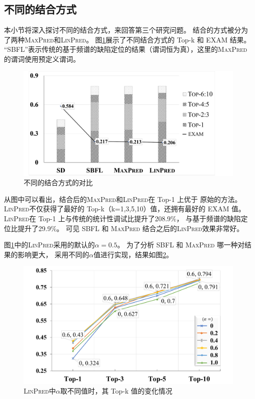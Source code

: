 \subsection{不同的结合方式}

本小节将深入探讨不同的结合方式，来回答第三个研究问题。
结合的方式被分为了两种\textsc{MaxPred}和\textsc{LinPred}。
图\ref{fig:diff-comb-compare}展示了不同结合方式的 Top-k 和 EXAM 结果。
“SBFL”表示传统的基于频谱的缺陷定位的结果（谓词恒为真），这里的\textsc{MaxPred}的谓词使用预定义谓词。

\begin{figure}[htbp] 
\centering 
\includegraphics[width=12cm]{figure/diff-comb-compare} 
\caption{不同的结合方式的对比} 
\label{fig:diff-comb-compare}
\end{figure}

从图中可以看出，结合后的\textsc{MaxPred}和\textsc{LinPred}在 Top-1 上优于
原始的方法。
\textsc{LinPred}不仅获得了最好的 Top-k（k=1,3,5,10）值，还拥有最好的 EXAM 值。
\textsc{LinPred}在 Top-1 上与传统的统计性调试比提升了208.9\%，
与基于频谱的缺陷定位比提升了29.9\%。
可见 SBFL 和 \textsc{MaxPred} 结合之后的\textsc{LinPred}效果非常好。

图\ref{fig:diff-comb-compare}中的\textsc{LinPred}采用的默认的$\alpha = 0.5$。
为了分析 SBFL 和 \textsc{MaxPred} 哪一种对结果的影响更大，
采用不同的$\alpha$值进行实现，结果如图\ref{fig:coefficient}。

\begin{figure}[htbp] 
\centering 
\includegraphics[width=12cm]{figure/coefficient} 
\caption{\textsc{LinPred}中$\alpha$取不同值时，其 Top-k 值的变化情况} 
\label{fig:coefficient}
\end{figure}

